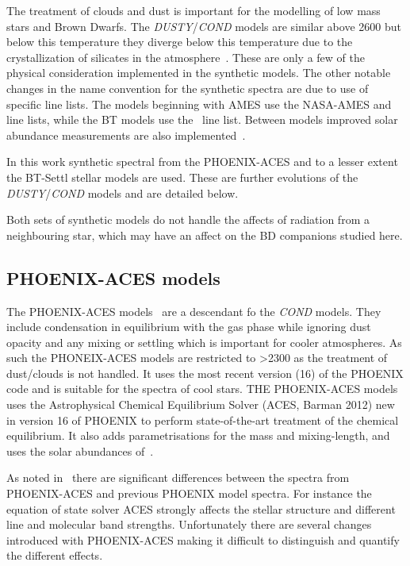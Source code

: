 The treatment of clouds and dust is important for the modelling of low mass stars and Brown Dwarfs.
The \emph{DUSTY}/\emph{COND} models are similar above 2600\K{} but below this temperature they diverge below this temperature due to the crystallization of silicates in the atmosphere~\citep{allard_limiting_2001}.
These are only a few of the physical consideration implemented in the synthetic models.
The other notable changes in the name convention for the synthetic spectra are due to use of specific line lists.
The models beginning with {AMES} use the {NASA-AMES}  and  line lists, while the {BT} models use the~\citet{barber_highaccuracy_2006}  line list.
Between models improved solar abundance measurements are also implemented~\citep[][]{asplund_chemical_2009}.

In this work synthetic spectral from the {PHOENIX-ACES} and to a lesser extent the {BT-Settl} stellar models are used.
These are further evolutions of the \emph{DUSTY}/\emph{COND} models and are detailed below.

Both sets of synthetic models do not handle the affects of radiation from a neighbouring star, which may have an affect on the BD companions studied here.

\subsection{{PHOENIX-ACES} models}
\label{subsec:phoenix_aces}

The {PHOENIX-ACES} models~\citep{husser_new_2013} are a descendant fo the \emph{COND} models.
They include condensation in equilibrium with the gas phase while ignoring dust opacity and any mixing or settling which is important for cooler atmospheres.
As such the {PHONEIX-ACES} models are restricted to \txteff{}>2300\K{} as the treatment of dust/clouds is not handled.
It uses the most recent version (16) of the {PHOENIX} code and is suitable for the spectra of cool stars.
THE {PHOENIX-ACES} models uses the Astrophysical Chemical Equilibrium Solver (ACES, Barman 2012) new in version 16 of PHOENIX to perform state-of-the-art treatment of the chemical equilibrium.
It also adds parametrisations for the mass and mixing-length, and uses the solar abundances of~\citet{asplund_chemical_2009}.

As noted in~\citep{husser_new_2013} there are significant differences between the spectra from {PHOENIX-ACES} and previous PHOENIX model spectra.
For instance the equation of state solver ACES strongly affects the stellar structure and different line and molecular band strengths.
Unfortunately there are several changes introduced with {PHOENIX-ACES} making it difficult to distinguish and quantify the different effects.


